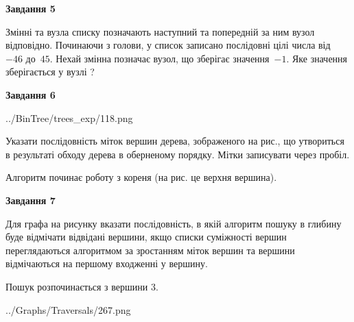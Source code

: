 \documentclass[12pt, ukrainian]{article}
\begin{document}
{\begin {large}
{\begin {center}\textbf{Завдання 5}\end {center}}\par
Змінні  та  вузла списку позначають наступний та попередній за ним вузол відповідно. Починаючи з голови, у список записано послідовні цілі числа від~$-46$ до~$45$. Нехай змінна  позначає вузол, що зберігає значення~$-1$.
Яке значення зберігається у вузлі  ?\par
\newpage

{\begin {center}\textbf{Завдання 6}\end {center}}\par

\begin{center}
	{../BinTree/trees_exp/118.png}
\end{center}
Указати послідовність міток вершин дерева, зображеного на рис., що утвориться в результаті обходу дерева в оберненому порядку. Мітки записувати через пробіл.\par Алгоритм починає роботу з кореня (на рис. це верхня вершина).\par
\newpage

{\begin {center}\textbf{Завдання 7}\end {center}}\par
Для графа на рисунку вказати послідовність, в якій алгоритм пошуку в глибину буде відмічати відвідані вершини, якщо списки суміжності вершин переглядаються алгоритмом за зростанням міток вершин та вершини відмічаються на першому вход\-женні у вершину.\par
Пошук розпочинається з вершини 3.\par

\begin{center}
	{../Graphs/Traversals/267.png}
\end{center}\par
\newpage


\end{large}}
\end{document}

